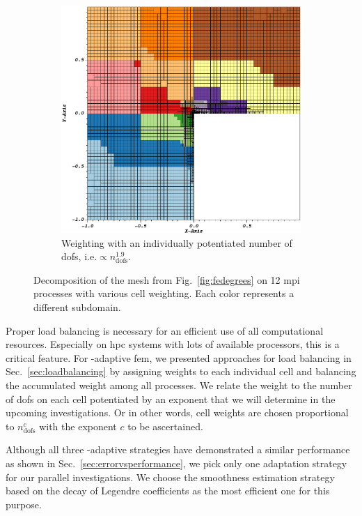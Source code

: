 \begin{figure}
\begin{subfigure}[t]{.49\textwidth}
  \includegraphics[width=\textwidth]{figures/results/corner-2d-error-hp-legendre-05_subdomain12_customweighting.png}
  \caption{Weighting with an individually potentiated number of \glspl{dof}, i.e.\@ $\propto n_\text{dofs}^{1.9}$.}
\end{subfigure}
\caption{Decomposition of the mesh from Fig.~\ref{fig:fedegrees} on 12 \gls{mpi} processes with various cell weighting. Each color represents a different subdomain.}
\label{fig:decomposition}
\end{figure}

Proper load balancing is necessary for an efficient use of all computational resources. Especially on \gls{hpc} systems with lots of available processors, this is a critical feature. For \hp-adaptive \gls{fem}, we presented approaches for load balancing in Sec.~\ref{sec:loadbalancing} by assigning weights to each individual cell and balancing the accumulated weight among all processes. We relate the weight to the number of \glspl{dof} on each cell potentiated by an exponent that we will determine in the upcoming investigations. Or in other words, cell weights are chosen proportional to $n_\text{dofs}^c$ with the exponent $c$ to be ascertained.

Although all three \hp-adaptive strategies have demonstrated a similar performance as shown in Sec.~\ref{sec:errorvsperformance}, we pick only one adaptation strategy for our parallel investigations. We choose the smoothness estimation strategy based on the decay of Legendre coefficients as the most efficient one for this purpose.


